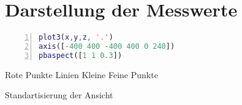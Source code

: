 \section{Darstellung der Messwerte}

\begin{lstlisting}[caption={Darstellung der Messwerte},language={Matlab}, label={import_data}, numbers=left]
plot3(x,y,z, '.')
axis([-400 400 -400 400 0 240])
pbaspect([1 1 0.3])
\end{lstlisting}

Rote Punkte
Linien
Kleine Feine Punkte

Standartisierung der Ansicht